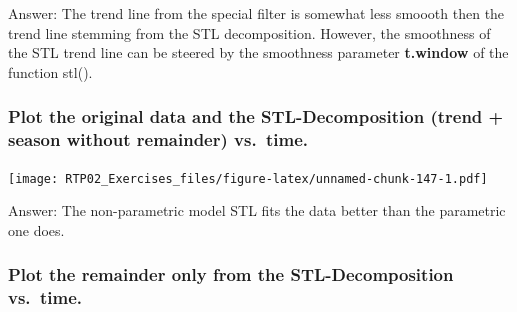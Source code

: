 \documentclass[
]{article}
\newenvironment{Shaded}{\begin{snugshade}}{\end{snugshade}}
\newcommand{\DataTypeTok}[1]{\textcolor[rgb]{0.13,0.29,0.53}{#1}}
\newcommand{\DecValTok}[1]{\textcolor[rgb]{0.00,0.00,0.81}{#1}}
\newcommand{\FloatTok}[1]{\textcolor[rgb]{0.00,0.00,0.81}{#1}}
\newcommand{\KeywordTok}[1]{\textcolor[rgb]{0.13,0.29,0.53}{\textbf{#1}}}
\newcommand{\NormalTok}[1]{#1}
\newcommand{\OperatorTok}[1]{\textcolor[rgb]{0.81,0.36,0.00}{\textbf{#1}}}
\newcommand{\StringTok}[1]{\textcolor[rgb]{0.31,0.60,0.02}{#1}}
\begin{document}
Answer: The trend line from the special filter is somewhat less smoooth
then the trend line stemming from the STL decomposition. However, the
smoothness of the STL trend line can be steered by the smoothness
parameter \textbf{t.window} of the function stl().

\hypertarget{plot-the-original-data-and-the-stl-decomposition-trend-season-without-remainder-vs.-time.}{%
\subsubsection{Plot the original data and the STL-Decomposition (trend +
season without remainder)
vs.~time.}\label{plot-the-original-data-and-the-stl-decomposition-trend-season-without-remainder-vs.-time.}}

\begin{Shaded}
\end{Shaded}

\texttt{[image: RTP02\_Exercises\_files/figure-latex/unnamed-chunk-147-1.pdf]}

Answer: The non-parametric model STL fits the data better than the
parametric one does.

\hypertarget{plot-the-remainder-only-from-the-stl-decomposition-vs.-time.}{%
\subsubsection{Plot the remainder only from the STL-Decomposition
vs.~time.}\label{plot-the-remainder-only-from-the-stl-decomposition-vs.-time.}}
\end{document}
